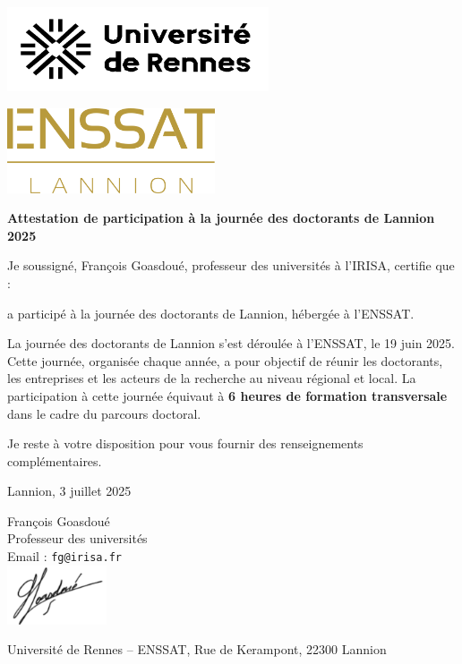 \documentclass[12pt,a4paper]{article}
\begin{document}
\begin{minipage}[t]{0.45\textwidth}
    \includegraphics[height=2.5cm]{logo_rennes.png}
\end{minipage}
\hfill
\begin{minipage}[t]{0.45\textwidth}
    \raggedleft
    \includegraphics[height=2.5cm]{logo_enssat.png}
\end{minipage}

\vspace{1.5cm}

\begin{center}
    {\LARGE\bfseries Attestation de participation à la journée des doctorants de Lannion 2025}
\end{center}

\vspace{1.5cm}

Je soussigné, François Goasdoué, professeur des universités à l'IRISA, certifie que :\\

\vspace{0.5cm}


\vspace{0.5cm}

a participé à la journée des doctorants de Lannion, hébergée à l’ENSSAT.

La journée des doctorants de Lannion s’est déroulée à l’ENSSAT, le 19 juin 2025. Cette journée, organisée chaque année, a pour objectif de réunir les doctorants, les entreprises et les acteurs de la recherche au niveau régional et local. La participation à cette journée équivaut à \textbf{6 heures de formation transversale} dans le cadre du parcours doctoral.


\vspace{1cm}

Je reste à votre disposition pour vous fournir des renseignements complémentaires.

\vspace{1.5cm}

\begin{flushright}
Lannion, 3 juillet 2025

François Goasdoué\\
Professeur des universités\\
Email : \texttt{fg@irisa.fr}\\
\includegraphics[height=1.75cm]{signature.png}


\end{flushright}

\vfill

{\small
Université de Rennes – ENSSAT, Rue de Kerampont, 22300 Lannion \\
}
\end{document}
